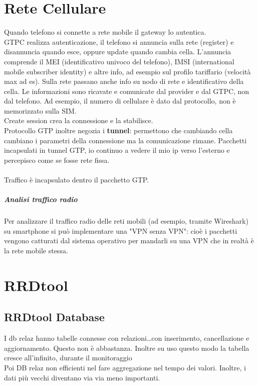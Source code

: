 \documentclass[10pt]{book}
\begin{document}
\chapter{Rete Cellulare}
Quando telefono si connette a rete mobile il gateway lo autentica.\\
GTPC realizza autenticazione, il telefono si annuncia sulla rete (register) e disannuncia quando esce, oppure update quando cambia cella. L'annuncia comprende il MEI (identificativo univoco del telefono), IMSI (international mobile subscriber identity) e altre info, ad  esempio sul profilo tariffario (velocità max ad es). Sulla rete passano anche info su nodo di rete e identificativo della cella. Le informazioni sono ricavate e comunicate dal provider e dal GTPC, non dal telefono. Ad esempio, il numero di cellulare è dato dal protocollo, non è memorizzato sulla SIM.\\
Create session crea la connessione e la stabilisce.\\
Protocollo GTP inoltre negozia i \textbf{tunnel}: permettono che cambiando cella cambiano i parametri della connessione ma la comunicazione rimane. Pacchetti incapsulati in tunnel GTP, io continuo a vedere il mio ip verso l'esterno e percepisco come se fosse rete fissa.\\\\
Traffico è incapsulato dentro il pacchetto GTP.
\paragraph{Analisi traffico radio} Per analizzare il traffico radio delle reti mobili (ad esempio, tramite Wireshark) su smartphone si può implementare una "VPN senza VPN": cioè i pacchetti vengono catturati dal sistema operativo per mandarli su una VPN che in realtà è la rete mobile stessa.
\chapter{RRDtool}
\section{RRDtool Database}
I db relaz hanno tabelle connesse con relazioni\ldots con inserimento, cancellazione e aggiornamento. Questo non è abbastanza. Inoltre su uso questo modo la tabella cresce all'infinito, durante il monitoraggio\\
Poi DB relaz non efficienti nel fare aggregazione nel tempo dei valori. Inoltre, i dati più vecchi diventano via via meno importanti.
\end{document}
